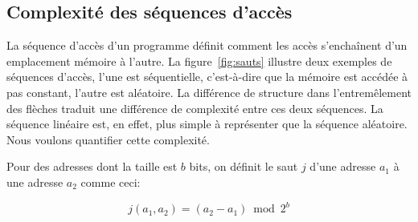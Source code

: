 
\subsection{\label{subsection:entropie}Complexité des séquences d'accès}

La séquence d'accès d'un programme définit comment les accès s'enchaînent d'un emplacement mémoire à l'autre.
La figure~\ref{fig:sauts} illustre deux exemples de séquences d'accès, l'une est séquentielle, c'est-à-dire que la mémoire est accédée à pas constant, l'autre est aléatoire.
La différence de structure dans l'entremêlement des flèches traduit une différence de complexité entre ces deux séquences. 
La séquence linéaire est, en effet, plus simple à représenter que la séquence aléatoire.
Nous voulons quantifier cette complexité.

Pour des adresses dont la taille est $b$ bits, on définit le saut $j$ d'une adresse $a_1$ à une adresse $a_2$ comme ceci:

$$ j(a_1, a_2) = (a_2 - a_1) \bmod 2^b$$

